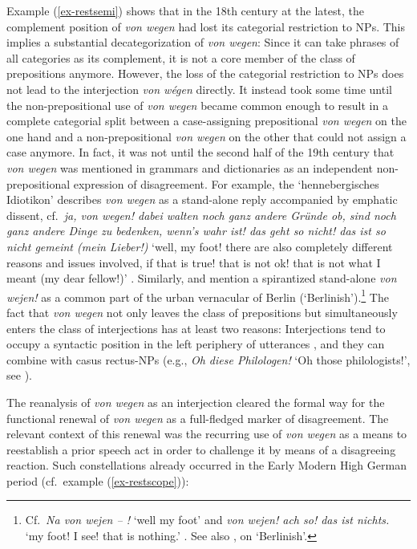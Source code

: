 \documentclass[output=paper
  ,nobabel
  ,draftmode
  ,babelshorthands
  ,colorlinks, citecolor=brown
]{langscibook}
\begin{document}
Example (\ref{ex-restsemi}) shows that in the 18th century at the latest, the complement position of \emph{von wegen} had lost its categorial restriction to NPs. This implies a substantial decategorization of \emph{von wegen}: Since it can take phrases of all categories as its complement, it is not a core member of the class of prepositions anymore. However, the loss of the categorial restriction to NPs does not lead to the interjection \emph{von wégen} directly. It instead took some time until the non-prepositional use of \emph{von wegen} became common enough to result in a complete categorial split between a case-assigning prepositional \emph{von wegen} on the one hand and a non-prepositional \emph{von wegen} on the other that could not assign a case anymore. In fact, it was not until the second half of the 19th century that \emph{von wegen} was mentioned in grammars and dictionaries as an independent non-prepositional expression of disagreement. For example, the `hennebergisches Idiotikon' describes \emph{von wegen} as a stand-alone reply accompanied by emphatic dissent, cf.\ \emph{ja, von wegen! dabei walten noch ganz andere Gründe ob, sind noch ganz andere Dinge zu bedenken, wenn’s wahr ist! das geht so nicht! das ist so nicht gemeint (mein Lieber!)} `well, my foot! there are also completely different reasons and issues involved, if that is true! that is not ok! that is not what I meant (my dear fellow!)' \citep[cf.][271–272]{Spiesz1881}. Similarly, \citet{Meyer1880} and \citet{Brendicke1897} mention a spirantized stand-alone \emph{von wejen!} as a common part of the urban vernacular of Berlin (`Berlinish').\footnote{Cf.\ \emph{Na von wejen – !} `well my foot' \citep[89]{Meyer1880} and \emph{von wejen! ach so! das ist nichts.} `my foot! I see! that is nothing.' \citep[190]{Brendicke1897}. See also \citet{Schlobinski1988}, \citet{SchoenfeldSchlobinski1998,Freywald2017} on `Berlinish'.}  The fact that \emph{von wegen} not only leaves the class of prepositions but simultaneously enters the class of interjections has at least two reasons: Interjections tend to occupy a syntactic position in the left periphery of utterances \citep[e.g.][31]{Nuebling2004}, and they can combine with casus rectus-NPs (e.g., \emph{Oh diese Philologen!} `Oh those philologists!', see \citealp[321–322]{Fries1992}).

The reanalysis of \emph{von wegen} as an interjection cleared the formal way for the functional renewal of \emph{von wegen} as a full-fledged marker of disagreement. The relevant context of this renewal was the recurring use of \emph{von wegen} as a means to reestablish a prior speech act in order to challenge it by means of a disagreeing reaction. Such constellations already occurred in the Early Modern High German period (cf.\ example (\ref{ex-restscope})):
\end{document}
